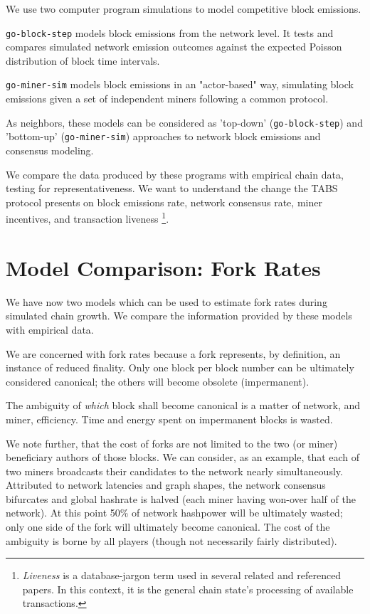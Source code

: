 \documentclass[11pt]{article}
\theoremstyle{plain}
\begin{document}
{We use two computer program simulations to model competitive block emissions.

\texttt{go-block-step} models block emissions from the network level.
It tests and compares simulated network emission outcomes
against the expected Poisson distribution of block time intervals.

\texttt{go-miner-sim} models block emissions in an "actor-based" way,
simulating block emissions given a set of independent miners following a common protocol.

As neighbors, these models can be considered as 'top-down' (\texttt{go-block-step}) and 'bottom-up' (\texttt{go-miner-sim})
approaches to network block emissions and consensus modeling.

We compare the data produced by these programs with empirical chain data, testing for representativeness.
We want to understand the change the TABS protocol presents on block emissions rate,
network consensus rate, miner incentives, and transaction liveness\nolinebreak
\footnote{\emph{Liveness} is a database-jargon term used in several related and referenced papers.
In this context, it is the general chain state's processing of available transactions.
}.


\section{\normalsize{Model Comparison: Fork Rates}}

We have now two models which can be used to estimate fork rates during
simulated chain growth. We compare the information provided by these models with
empirical data.

We are concerned with fork rates because a fork represents, by definition, an
instance of reduced finality. Only one block per block number can be ultimately
considered canonical; the others will become obsolete (impermanent).

The ambiguity of \emph{which} block shall become canonical is a matter of
network, and miner, efficiency. Time and energy spent on impermanent blocks is 
wasted.

We note further, that the cost of forks are not limited to the two (or miner)
beneficiary authors of those blocks. We can consider, as an example, that each
of two miners broadcasts their candidates to the network nearly simultaneously.
Attributed to network latencies and graph shapes, the network consensus bifurcates
and global hashrate is halved (each miner having won-over half of the network).
At this point 50\% of network hashpower will be ultimately wasted; only one
side of the fork will ultimately become canonical. The cost of the ambiguity is
borne by all players (though not necessarily fairly distributed).

}
\end{document}
